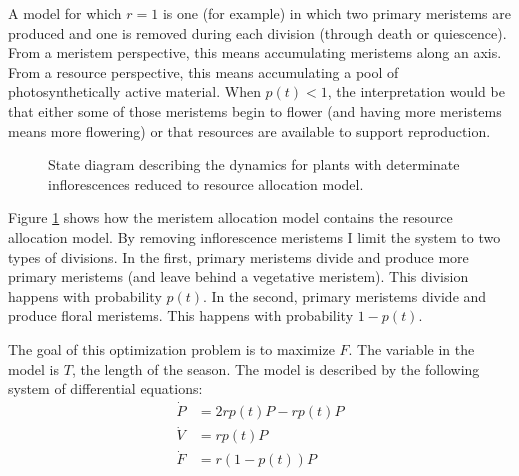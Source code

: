 \documentclass[12pt, oneside]{article}   	%
\begin{document}
A model for which $ r = 1 $ is one (for example) in which two primary meristems are produced and one is removed during each division (through death or quiescence). From a meristem perspective, this means accumulating meristems along an axis. From a resource perspective, this means accumulating a pool of photosynthetically active material. When $p(t)<1$, the interpretation would be that either some of those meristems begin to flower (and having more meristems means more flowering) or that resources are available to support reproduction. 

\begin{figure}[hbt!]
\centering
{}
  \caption{State diagram describing the dynamics for plants with determinate inflorescences reduced to resource allocation model.}
  \label{fig:state-determinate-transform}
\end{figure}

Figure \ref{fig:state-determinate-transform} shows how the meristem allocation model contains the resource allocation model. By removing inflorescence meristems I limit the system to two types of divisions. In the first, primary meristems divide and produce more primary meristems (and leave behind a vegetative meristem). This division happens with probability $p(t)$. In the second, primary meristems divide and produce floral meristems. This happens with probability $1-p(t)$. 

The goal of this optimization problem is to maximize $F$. The variable in the model is $T$, the length of the season. The model is described by the following system of differential equations:
%
\begin{align}
\dot{P} & = 2 r p(t) P - r p(t) P \nonumber \\
\dot{V} & = r p(t) P \nonumber \\
\dot{F} & = r ( 1-p(t) ) P 
\label{eqn:de-determinate}
\end{align}
\end{document}
